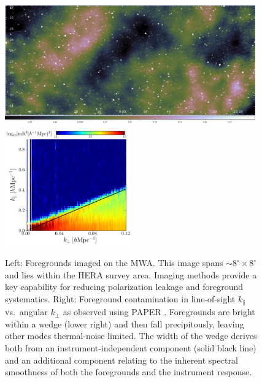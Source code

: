 \documentclass[preprint]{aastex}
\def\kperp{k_{\bot}}
\def\kpar{k_{\|}}
\def\kperp{k_{\bot}}
\def\kpar{k_{\|}}
\begin{document}
\begin{figure}[t] \centering
\includegraphics[height=2.02in]{plots/Foregrounds/MWA_EoR0_2min.jpg}
\includegraphics[height=2.02in]{plots/wedge_tall_wide.png} \caption{\small Left:
Foregrounds imaged on the MWA.
This image spans $\sim$$8^{\circ} \times 8^{\circ} $ and
lies within the HERA survey area. Imaging methods provide a key capability for reducing
polarization leakage and foreground systematics.  
Right: Foreground contamination in line-of-sight $\kpar$ vs.\ angular $\kperp$
as observed using PAPER \citep{pober_et_al2013}.
Foregrounds are bright within a wedge (lower right) and then fall 
precipitously, leaving other modes thermal-noise limited.
The width of the wedge derives both from an instrument-independent component 
(solid black line) and an additional component relating to the inherent spectral smoothness
of both the foregrounds and the instrument response.
}\label{fig:twoFGViews} \end{figure}
\end{document}
